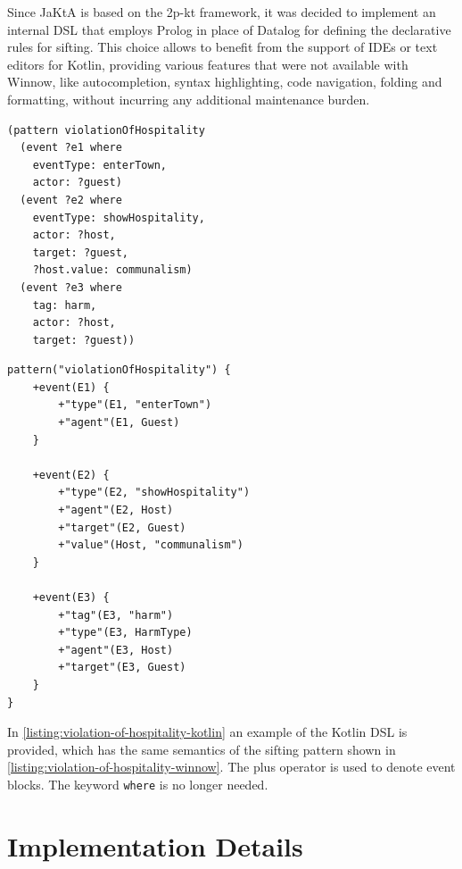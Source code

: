 \documentclass{scrartcl}
\begin{document}
Since JaKtA is based on the 2p-kt \cite{DBLP:conf/woa/CiattoCSDO20} framework, it was decided to implement an internal DSL that employs Prolog in place of Datalog for defining the declarative rules for sifting.
%
This choice allows to benefit from the support of IDEs or text editors for Kotlin, providing various features that were not available with Winnow, like autocompletion, syntax highlighting, code navigation, folding and formatting, without incurring any additional maintenance burden.

\begin{listing}[ht]
\begin{verbatim}
(pattern violationOfHospitality
  (event ?e1 where
    eventType: enterTown,
    actor: ?guest)
  (event ?e2 where
    eventType: showHospitality,
    actor: ?host,
    target: ?guest,
    ?host.value: communalism)
  (event ?e3 where
    tag: harm,
    actor: ?host,
    target: ?guest))
\end{verbatim}
\caption{The violation of hospitality pattern as written in Winnow.}
\label{listing:violation-of-hospitality-winnow}
\end{listing}

\begin{listing}[ht]
\begin{verbatim}
pattern("violationOfHospitality") {
    +event(E1) {
        +"type"(E1, "enterTown")
        +"agent"(E1, Guest)
    }

    +event(E2) {
        +"type"(E2, "showHospitality")
        +"agent"(E2, Host)
        +"target"(E2, Guest)
        +"value"(Host, "communalism")
    }

    +event(E3) {
        +"tag"(E3, "harm")
        +"type"(E3, HarmType)
        +"agent"(E3, Host)
        +"target"(E3, Guest)
    }
}
\end{verbatim}
\caption{The violation of hospitality pattern as written with the Kotlin DSL.}
\label{listing:violation-of-hospitality-kotlin}
\end{listing}

In \ref{listing:violation-of-hospitality-kotlin} an example of the Kotlin DSL is provided, which has the same semantics of the sifting pattern shown in \ref{listing:violation-of-hospitality-winnow}. The plus operator is used to denote event blocks. The keyword \verb|where| is no longer needed.

\section{Implementation Details}
\end{document}
